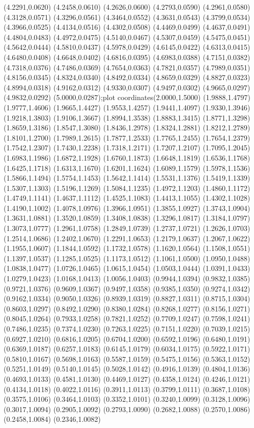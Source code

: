 {(4.2291,0.0620) (4.2458,0.0610) (4.2626,0.0600) (4.2793,0.0590) (4.2961,0.0580) (4.3128,0.0571) (4.3296,0.0561) (4.3464,0.0552) (4.3631,0.0543) (4.3799,0.0534) (4.3966,0.0525) (4.4134,0.0516) (4.4302,0.0508) (4.4469,0.0499) (4.4637,0.0491) (4.4804,0.0483) (4.4972,0.0475) (4.5140,0.0467) (4.5307,0.0459) (4.5475,0.0451) (4.5642,0.0444) (4.5810,0.0437) (4.5978,0.0429) (4.6145,0.0422) (4.6313,0.0415) (4.6480,0.0408) (4.6648,0.0402) (4.6816,0.0395) (4.6983,0.0388) (4.7151,0.0382) (4.7318,0.0376) (4.7486,0.0369) (4.7654,0.0363) (4.7821,0.0357) (4.7989,0.0351) (4.8156,0.0345) (4.8324,0.0340) (4.8492,0.0334) (4.8659,0.0329) (4.8827,0.0323) (4.8994,0.0318) (4.9162,0.0312) (4.9330,0.0307) (4.9497,0.0302) (4.9665,0.0297) (4.9832,0.0292) (5.0000,0.0287)};plot coordinates{(2.0000,1.5000) (1.9888,1.4797) (1.9777,1.4606) (1.9665,1.4427) (1.9553,1.4257) (1.9441,1.4097) (1.9330,1.3946) (1.9218,1.3803) (1.9106,1.3667) (1.8994,1.3538) (1.8883,1.3415) (1.8771,1.3298) (1.8659,1.3186) (1.8547,1.3080) (1.8436,1.2978) (1.8324,1.2881) (1.8212,1.2789) (1.8101,1.2700) (1.7989,1.2615) (1.7877,1.2533) (1.7765,1.2455) (1.7654,1.2379) (1.7542,1.2307) (1.7430,1.2238) (1.7318,1.2171) (1.7207,1.2107) (1.7095,1.2045) (1.6983,1.1986) (1.6872,1.1928) (1.6760,1.1873) (1.6648,1.1819) (1.6536,1.1768) (1.6425,1.1718) (1.6313,1.1670) (1.6201,1.1624) (1.6089,1.1579) (1.5978,1.1536) (1.5866,1.1494) (1.5754,1.1453) (1.5642,1.1414) (1.5531,1.1376) (1.5419,1.1339) (1.5307,1.1303) (1.5196,1.1269) (1.5084,1.1235) (1.4972,1.1203) (1.4860,1.1172) (1.4749,1.1141) (1.4637,1.1112) (1.4525,1.1083) (1.4413,1.1055) (1.4302,1.1028) (1.4190,1.1002) (1.4078,1.0976) (1.3966,1.0951) (1.3855,1.0927) (1.3743,1.0904) (1.3631,1.0881) (1.3520,1.0859) (1.3408,1.0838) (1.3296,1.0817) (1.3184,1.0797) (1.3073,1.0777) (1.2961,1.0758) (1.2849,1.0739) (1.2737,1.0721) (1.2626,1.0703) (1.2514,1.0686) (1.2402,1.0670) (1.2291,1.0653) (1.2179,1.0637) (1.2067,1.0622) (1.1955,1.0607) (1.1844,1.0592) (1.1732,1.0578) (1.1620,1.0564) (1.1508,1.0551) (1.1397,1.0537) (1.1285,1.0525) (1.1173,1.0512) (1.1061,1.0500) (1.0950,1.0488) (1.0838,1.0477) (1.0726,1.0465) (1.0615,1.0454) (1.0503,1.0444) (1.0391,1.0433) (1.0279,1.0423) (1.0168,1.0413) (1.0056,1.0403) (0.9944,1.0394) (0.9832,1.0385) (0.9721,1.0376) (0.9609,1.0367) (0.9497,1.0358) (0.9385,1.0350) (0.9274,1.0342) (0.9162,1.0334) (0.9050,1.0326) (0.8939,1.0319) (0.8827,1.0311) (0.8715,1.0304) (0.8603,1.0297) (0.8492,1.0290) (0.8380,1.0284) (0.8268,1.0277) (0.8156,1.0271) (0.8045,1.0264) (0.7933,1.0258) (0.7821,1.0252) (0.7709,1.0247) (0.7598,1.0241) (0.7486,1.0235) (0.7374,1.0230) (0.7263,1.0225) (0.7151,1.0220) (0.7039,1.0215) (0.6927,1.0210) (0.6816,1.0205) (0.6704,1.0200) (0.6592,1.0196) (0.6480,1.0191) (0.6369,1.0187) (0.6257,1.0183) (0.6145,1.0179) (0.6034,1.0175) (0.5922,1.0171) (0.5810,1.0167) (0.5698,1.0163) (0.5587,1.0159) (0.5475,1.0156) (0.5363,1.0152) (0.5251,1.0149) (0.5140,1.0145) (0.5028,1.0142) (0.4916,1.0139) (0.4804,1.0136) (0.4693,1.0133) (0.4581,1.0130) (0.4469,1.0127) (0.4358,1.0124) (0.4246,1.0121) (0.4134,1.0118) (0.4022,1.0116) (0.3911,1.0113) (0.3799,1.0111) (0.3687,1.0108) (0.3575,1.0106) (0.3464,1.0103) (0.3352,1.0101) (0.3240,1.0099) (0.3128,1.0096) (0.3017,1.0094) (0.2905,1.0092) (0.2793,1.0090) (0.2682,1.0088) (0.2570,1.0086) (0.2458,1.0084) (0.2346,1.0082) }
